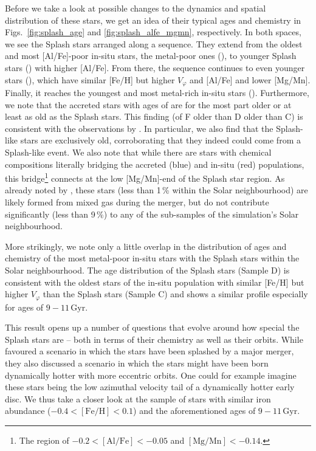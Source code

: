 \documentclass[fleqn,usenatbib]{mnras}
\begin{document}
Before we take a look at possible changes to the dynamics and spatial distribution of these stars, we get an idea of their typical ages and chemistry in Figs.~\ref{fig:splash_age} and \ref{fig:splash_alfe_mgmn}, respectively. In both spaces, we see the Splash stars arranged along a sequence. They extend from the oldest and most [Al/Fe]-poor in-situ stars, the metal-poor ones (), to younger Splash stars () with higher [Al/Fe]. From there, the sequence continues to even younger stars (), which have similar [Fe/H] but higher $V_\varphi$ and [Al/Fe] and lower [Mg/Mn]. Finally, it reaches the youngest and most metal-rich in-situ stars (). Furthermore, we note that the accreted stars with ages of  are for the most part older or at least as old as the Splash stars. This finding (of F older than D older than C) is consistent with the observations by \citet{Belokurov2020}. In particular, we also find that the Splash-like stars are exclusively old, corroborating that they indeed could come from a Splash-like event. We also note that while there are stars with chemical compositions literally bridging the accreted (blue) and in-situ (red) populations, this bridge\footnote{The region of $-0.2 < \mathrm{[Al/Fe]} < -0.05$ and $\mathrm{[Mg/Mn]} < -0.14$.} connects at the low [Mg/Mn]-end of the Splash star region. As already noted by \citet{Buder2024}, these stars  (less than 1\,\% within the Solar neighbourhood) are likely formed from mixed gas during the merger, but do not contribute significantly (less than 9\,\%) to any of the sub-samples of the simulation's Solar neighbourhood.

More strikingly, we note only a little overlap in the distribution of ages and chemistry of the most metal-poor in-situ stars with the Splash stars within the Solar neighbourhood. The age distribution of the Splash stars (Sample D) is consistent with the oldest stars of the in-situ population with similar [Fe/H] but higher $V_\varphi$ than the Splash stars (Sample C) and shows a similar profile especially for ages of $9-11\,\mathrm{Gyr}$.

This result opens up a number of questions that evolve around how special the Splash stars are -- both in terms of their chemistry as well as their orbits. While \citet{Belokurov2020} favoured a scenario in which the stars have been splashed by a major merger, they also discussed a scenario in which the stars might have been born dynamically hotter with more eccentric orbits. One could for example imagine these stars being the low azimuthal velocity tail of a dynamically hotter early disc. We thus take a closer look at the sample of stars with similar iron abundance ($-0.4 < \mathrm{[Fe/H]} < 0.1$) and the aforementioned ages of $9-11\,\mathrm{Gyr}$.
\end{document}
